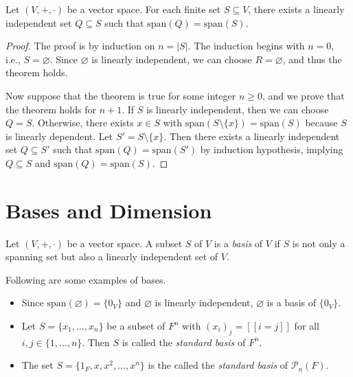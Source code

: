 \begin{theorem}\label{thm:linearly-independent-subset}
  Let $(V, +, \cdot)$ be a vector space.
  For each finite set $S \subseteq V$, there exists a linearly independent
  set $Q \subseteq S$ such that $\mathrm{span}(Q) = \mathrm{span}(S)$.
\end{theorem}
\begin{proof}
  The proof is by induction on $n = |S|$.
  The induction begins with $n = 0$, i.e., $S = \varnothing$.
  Since $\varnothing$ is linearly independent, we can choose
  $R = \varnothing$, and thus the theorem holds.

  Now suppose that the theorem is true for some integer $n \geq 0$,
  and we prove that the theorem holds for $n + 1$.
  If $S$ is linearly independent, then we can choose $Q = S$.
  Otherwise, there exists $x \in S$
  with $\mathrm{span}(S \setminus \{x\}) = \mathrm{span}(S)$ because
  $S$ is linearly dependent.
  Let $S' = S \setminus \{x\}$. Then there exists a linearly independent set
  $Q \subseteq S'$ such that $\mathrm{span}(Q) = \mathrm{span}(S')$ by
  induction hypothesis, implying
  $Q \subseteq S$ and $\mathrm{span}(Q) = \mathrm{span}(S)$.
\end{proof}

\section{Bases and Dimension}
\begin{definition}\label{def:basis}
  Let $(V, +, \cdot)$ be a vector space. A subset $S$ of $V$ is a \emph{basis}
  of $V$ if $S$ is not only a spanning set but also a linearly independent set
  of $V$.
\end{definition}

\begin{example}
  Following are some examples of bases.
  \begin{itemize}
    \item Since $\mathrm{span}(\varnothing) = \{0_V\}$ and $\varnothing$ is
      linearly independent, $\varnothing$ is a basis of $\{0_V\}$.
    \item Let $S = \{x_1, \dots, x_n\}$ be a subset of $F^n$ with
      $(x_i)_j = [\![i = j]\!]$ for all $i, j \in \{1, \dots, n\}$.
      Then $S$ is called the \emph{standard basis} of $F^n$.
    \item The set $S = \{1_F, x, x^2, \dots, x^n\}$ is the called the
      \emph{standard basis} of $\mathcal{P}_n(F)$.
  \end{itemize}
\end{example}

